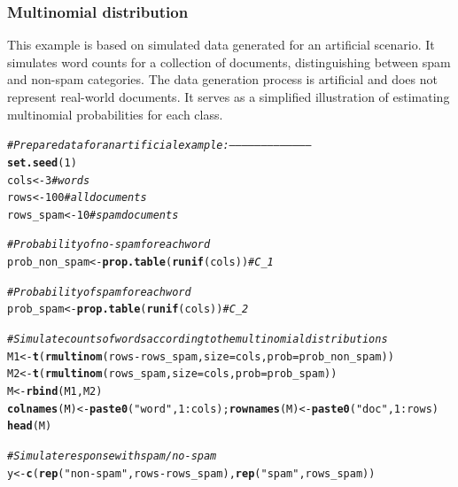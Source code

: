 \documentclass{article}\usepackage[]{graphicx}\usepackage[]{xcolor}
\makeatletter
\newcommand{\hlnum}[1]{\textcolor[rgb]{0.686,0.059,0.569}{#1}}%
\newcommand{\hlstr}[1]{\textcolor[rgb]{0.192,0.494,0.8}{#1}}%
\newcommand{\hlcom}[1]{\textcolor[rgb]{0.678,0.584,0.686}{\textit{#1}}}%
\newcommand{\hlopt}[1]{\textcolor[rgb]{0,0,0}{#1}}%
\newcommand{\hlstd}[1]{\textcolor[rgb]{0.345,0.345,0.345}{#1}}%
\newcommand{\hlkwb}[1]{\textcolor[rgb]{0.69,0.353,0.396}{#1}}%
\newcommand{\hlkwc}[1]{\textcolor[rgb]{0.333,0.667,0.333}{#1}}%
\newcommand{\hlkwd}[1]{\textcolor[rgb]{0.737,0.353,0.396}{\textbf{#1}}}%
\newenvironment{kframe}{%
 \def\at@end@of@kframe{}%
 \ifinner\ifhmode%
  \def\at@end@of@kframe{\end{minipage}}%
  \begin{minipage}{\columnwidth}%
 \fi\fi%
 \def\FrameCommand##1{\hskip\@totalleftmargin \hskip-\fboxsep
 \colorbox{shadecolor}{##1}\hskip-\fboxsep
     \hskip-\linewidth \hskip-\@totalleftmargin \hskip\columnwidth}%
 \MakeFramed {\advance\hsize-\width
   \@totalleftmargin\z@ \linewidth\hsize
   \@setminipage}}%
 {\par\unskip\endMakeFramed%
 \at@end@of@kframe}
\newenvironment{knitrout}{}{} %
\makeatother
\begin{document}
\subsubsection{Multinomial distribution}

This example is based on simulated data generated for an artificial scenario. It simulates word counts for a collection of documents, distinguishing between spam and non-spam categories. The data generation process is artificial and does not represent real-world documents. It serves as a simplified illustration of estimating multinomial probabilities for each class.

\begin{knitrout}
\color{fgcolor}\begin{kframe}
\begin{alltt}
\hlcom{# Prepare data for an artificial example: --------------------------------------}
\hlkwd{set.seed}\hlstd{(}\hlnum{1}\hlstd{)}
\hlstd{cols} \hlkwb{<-} \hlnum{3}       \hlcom{# words}
\hlstd{rows} \hlkwb{<-} \hlnum{100}     \hlcom{# all documents}
\hlstd{rows_spam} \hlkwb{<-} \hlnum{10} \hlcom{# spam documents}

\hlcom{# Probability of no-spam for each word}
\hlstd{prob_non_spam} \hlkwb{<-} \hlkwd{prop.table}\hlstd{(}\hlkwd{runif}\hlstd{(cols))} \hlcom{# C_1}

\hlcom{# Probability of spam for each word}
\hlstd{prob_spam} \hlkwb{<-} \hlkwd{prop.table}\hlstd{(}\hlkwd{runif}\hlstd{(cols))} \hlcom{# C_2}

\hlcom{# Simulate counts of words according to the multinomial distributions}
\hlstd{M1} \hlkwb{<-} \hlkwd{t}\hlstd{(}\hlkwd{rmultinom}\hlstd{(rows} \hlopt{-} \hlstd{rows_spam,} \hlkwc{size} \hlstd{= cols,} \hlkwc{prob} \hlstd{= prob_non_spam))}
\hlstd{M2} \hlkwb{<-} \hlkwd{t}\hlstd{(}\hlkwd{rmultinom}\hlstd{(rows_spam,}        \hlkwc{size} \hlstd{= cols,} \hlkwc{prob} \hlstd{= prob_spam))}
\hlstd{M} \hlkwb{<-} \hlkwd{rbind}\hlstd{(M1, M2)}
\hlkwd{colnames}\hlstd{(M)} \hlkwb{<-} \hlkwd{paste0}\hlstd{(}\hlstr{"word"}\hlstd{,} \hlnum{1}\hlopt{:}\hlstd{cols) ;} \hlkwd{rownames}\hlstd{(M)} \hlkwb{<-} \hlkwd{paste0}\hlstd{(}\hlstr{"doc"}\hlstd{,} \hlnum{1}\hlopt{:}\hlstd{rows)}
\hlkwd{head}\hlstd{(M)}

\hlcom{# Simulate response with spam/no-spam}
\hlstd{y} \hlkwb{<-} \hlkwd{c}\hlstd{(}\hlkwd{rep}\hlstd{(}\hlstr{"non-spam"}\hlstd{, rows} \hlopt{-} \hlstd{rows_spam),} \hlkwd{rep}\hlstd{(}\hlstr{"spam"}\hlstd{, rows_spam))}


\end{alltt}
\end{kframe}
\end{knitrout}
\end{document}

